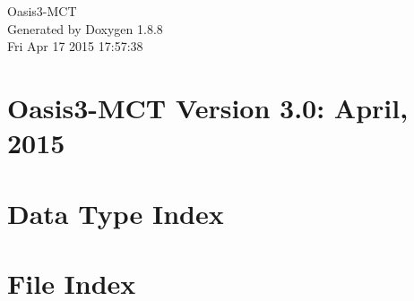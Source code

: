 \documentclass[twoside]{book}
\newcommand{\+}{\discretionary{\mbox{\scriptsize$\hookleftarrow$}}{}{}}
\newcommand{\clearemptydoublepage}{%
  \newpage{\pagestyle{empty}\cleardoublepage}%
}
\begin{document}
\hypersetup{pageanchor=false,
             bookmarks=true,
             bookmarksnumbered=true,
             pdfencoding=unicode
            }
\begin{titlepage}
\vspace*{7cm}
\begin{center}%
{\Large Oasis3-\/\+M\+C\+T }\\
\vspace*{1cm}
{\large Generated by Doxygen 1.8.8}\\
\vspace*{0.5cm}
{\small Fri Apr 17 2015 17:57:38}\\
\end{center}
\end{titlepage}
\clearemptydoublepage
\tableofcontents
\clearemptydoublepage
{}
\hypersetup{pageanchor=true}

\chapter{Oasis3-\/\+M\+C\+T Version 3.0\+: April, 2015}
\label{index}\hypertarget{index}{}
\chapter{Data Type Index}

\chapter{File Index}

\end{document}
